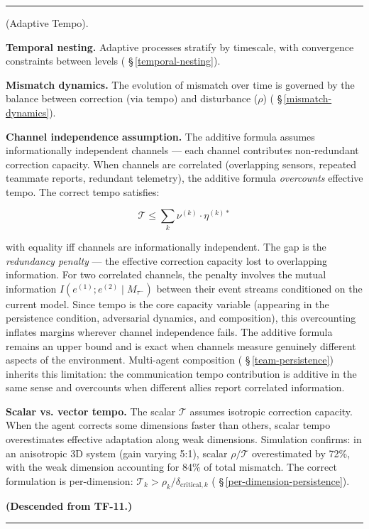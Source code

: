\documentclass[11pt,oneside]{article}
\newcounter{claim}[section]
\renewcommand{\theclaim}{\thesection.\arabic{claim}}
\newenvironment{segment}[2]{%
  \refstepcounter{claim}%
  \bigskip\noindent\hrule\smallskip
  \noindent{\bfseries #1~\theclaim}\enskip(#2).\par\smallskip
  \noindent\ignorespaces
}{%
  \par\smallskip\noindent\hrule\bigskip
}
\newenvironment{definition}[1][]{\begin{segment}{Definition}{#1}}{\end{segment}}
\begin{document}
\begin{definition}[Adaptive Tempo]
\textbf{Temporal nesting.} Adaptive processes stratify by timescale, with convergence constraints between levels ( \S\,\ref{temporal-nesting}).

\textbf{Mismatch dynamics.} The evolution of mismatch over time is governed by the balance between correction (via tempo) and disturbance ($\rho$) ( \S\,\ref{mismatch-dynamics}).

\textbf{Channel independence assumption.} The additive formula assumes informationally independent channels — each channel contributes non-redundant correction capacity. When channels are correlated (overlapping sensors, repeated teammate reports, redundant telemetry), the additive formula \textit{overcounts} effective tempo. The correct tempo satisfies:

$$\mathcal{T} \leq \sum_k \nu^{(k)} \cdot \eta^{(k)*}$$

with equality iff channels are informationally independent. The gap is the \textit{redundancy penalty} — the effective correction capacity lost to overlapping information. For two correlated channels, the penalty involves the mutual information $I(e^{(1)}; e^{(2)} \mid M_{\tau^-})$ between their event streams conditioned on the current model. Since tempo is the core capacity variable (appearing in the persistence condition, adversarial dynamics, and composition), this overcounting inflates margins wherever channel independence fails. The additive formula remains an upper bound and is exact when channels measure genuinely different aspects of the environment. Multi-agent composition ( \S\,\ref{team-persistence}) inherits this limitation: the communication tempo contribution is additive in the same sense and overcounts when different allies report correlated information.

\textbf{Scalar vs. vector tempo.} The scalar $\mathcal{T}$ assumes isotropic correction capacity. When the agent corrects some dimensions faster than others, scalar tempo overestimates effective adaptation along weak dimensions. Simulation confirms: in an anisotropic 3D system (gain varying 5:1), scalar $\rho/\mathcal{T}$ overestimated by 72\%, with the weak dimension accounting for 84\% of total mismatch. The correct formulation is per-dimension: $\mathcal{T}_k > \rho_k / \delta_{\text{critical},k}$ ( \S\,\ref{per-dimension-persistence}).

\textbf{(Descended from TF-11.)}
\end{definition}
\end{document}

